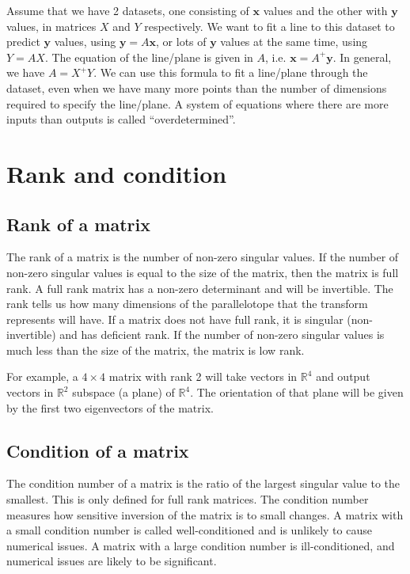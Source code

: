 \documentclass[a4paper, openany]{memoir}
\begin{document}
    Assume that we have 2 datasets, one consisting of $\mathbf{x}$ values and the other with $\mathbf{y}$ values, in matrices $X$ and $Y$ respectively. We want to fit a line to this dataset to predict $\mathbf{y}$ values, using $\mathbf{y} = A \mathbf{x}$, or lots of $\mathbf{y}$ values at the same time, using $Y = AX$. The equation of the line/plane is given in $A$, i.e. $\mathbf{x} = A^+ \mathbf{y}$. In general, we have $A = X^+ Y$. We can use this formula to fit a line/plane through the dataset, even when we have many more points than the number of dimensions required to specify the line/plane. A system of equations where there are more inputs than outputs is called ``overdetermined''.
    
    \section{Rank and condition}
    \subsection{Rank of a matrix}
    The rank of a matrix is the number of non-zero singular values. If the number of non-zero singular values is equal to the size of the matrix, then the matrix is full rank. A full rank matrix has a non-zero determinant and will be invertible. The rank tells us how many dimensions of the parallelotope that the transform represents will have. If a matrix does not have full rank, it is singular (non-invertible) and has deficient rank. If the number of non-zero singular values is much less than the size of the matrix, the matrix is low rank.

    For example, a $4 \times 4$ matrix with rank 2 will take vectors in $\mathbb{R}^4$ and output vectors in $\mathbb{R}^2$ subspace (a plane) of $\mathbb{R}^4$. The orientation of that plane will be given by the first two eigenvectors of the matrix.

    \subsection{Condition of a matrix}
    The condition number of a matrix is the ratio of the largest singular value to the smallest. This is only defined for full rank matrices. The condition number measures how sensitive inversion of the matrix is to small changes. A matrix with a small condition number is called well-conditioned and is unlikely to cause numerical issues. A matrix with a large condition number is ill-conditioned, and numerical issues are likely to be significant.
\end{document}
